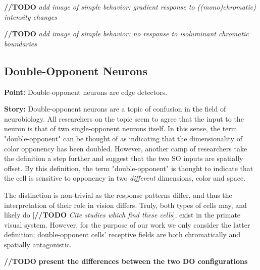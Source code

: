 \documentclass[journal,onecolumn]{IEEEtran}
\begin{document}
\textbf{//TODO} \textit{add image of simple behavior: gradient response to ((mono)chromatic) intensity changes}

\textbf{//TODO} \textit{add image of simple behavior: no response to isoluminant chromatic boundaries}

\subsection*{Double-Opponent Neurons}

\textbf{Point:}
Double-opponent neurons are edge detectors. 

\textbf{Story:}
Double-opponent neurons are a topic of confusion in the field of neurobiology. All researchers on the topic seem to agree that the input to the neuron is that of two single-opponent neurons itself. In this sense, the term "double-opponent" can be thought of as indicating that the dimensionality of color opponency has been doubled. However, another camp of researchers take the definition a step further and suggest that the two SO inputs are spatially offset. By this definition, the term "double-opponent" is thought to indicate that the cell is sensitive to opponency in two \textit{different} dimensions, color and space.

The distinction is non-trivial as the response patterns differ, and thus the interpretation of their role in vision differs. Truly, both types of cells may, and likely do [\textbf{//TODO} \textit{Cite studies which find these cells}], exist in the primate visual system. However, for the purpose of our work we only consider the latter definition; double-opponent cells' receptive fields are both chromatically and spatially antagonistic.

\textbf{//TODO} \textbf{present the differences between the two DO configurations}
\end{document}
